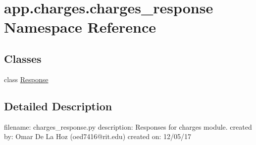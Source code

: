 \hypertarget{namespaceapp_1_1charges_1_1charges__response}{}\section{app.\+charges.\+charges\+\_\+response Namespace Reference}
\label{namespaceapp_1_1charges_1_1charges__response}
\subsection*{Classes}
\begin{DoxyCompactItemize}
\item 
class \mbox{\hyperlink{classapp_1_1charges_1_1charges__response_1_1_response}{Response}}
\end{DoxyCompactItemize}


\subsection{Detailed Description}
\begin{DoxyVerb}filename: charges_response.py
description: Responses for charges module.
created by: Omar De La Hoz (oed7416@rit.edu)
created on: 12/05/17
\end{DoxyVerb}
 